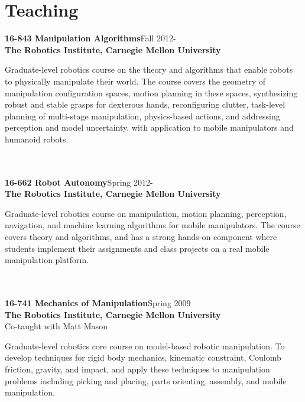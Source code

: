 \documentclass[10pt]{article}
\begin{document}
\section{Teaching}
\noindent
\textbf{16-843 Manipulation Algorithms}\hfill Fall 2012-\\
\textbf{The Robotics Institute, Carnegie Mellon University}\\
\parbox[t]{0.75\textwidth}{
Graduate-level robotics course on the theory and algorithms that enable robots to physically manipulate their world. The course covers the geometry of manipulation configuration spaces, motion planning in these spaces, synthesizing robust and stable grasps for dexterous hands, reconfiguring clutter, task-level planning of multi-stage manipulation, physics-based actions, and addressing perception and model uncertainty, with application to mobile manipulators and humanoid robots.
}\\
\\
\noindent
\textbf{16-662 Robot Autonomy}\hfill Spring 2012-\\
\textbf{The Robotics Institute, Carnegie Mellon University}\\
\parbox[t]{0.75\textwidth}{
Graduate-level robotics course on manipulation, motion planning, perception, navigation,
and machine learning algorithms for mobile manipulators. The course covers theory and algorithms,
and has a strong hands-on component where students implement their assignments and class projects on a real mobile manipulation platform.
}\\
\\
\textbf{16-741 Mechanics of Manipulation}\hfill Spring 2009\\
\textbf{The Robotics Institute, Carnegie Mellon University}\\
Co-taught with Matt Mason\\
\parbox[t]{0.75\textwidth}{
Graduate-level robotics core course on model-based robotic manipulation.
To develop techniques for rigid body mechanics, kinematic constraint, Coulomb
friction, gravity, and impact, and apply these techniques to manipulation
problems including picking and placing, parts orienting, assembly, and mobile
manipulation. 
}\\
\end{document}
